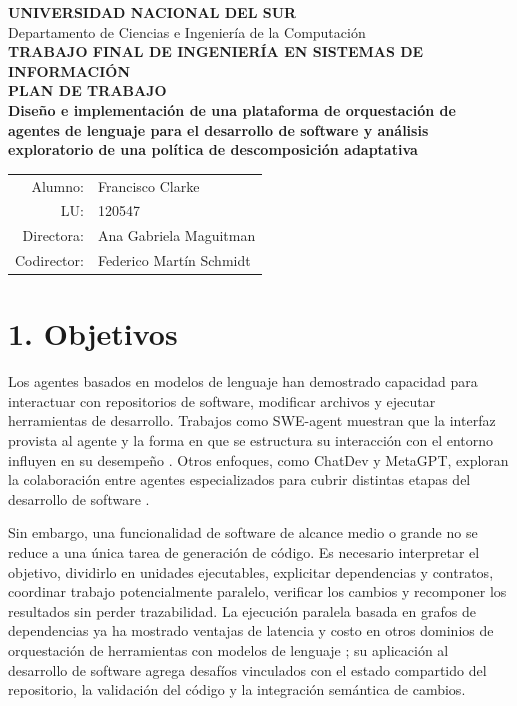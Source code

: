 \documentclass[11pt,a4paper]{article}
\newcommand{\autor}{Francisco Clarke}
\newcommand{\lu}{120547}
\newcommand{\director}{Ana Gabriela Maguitman}
\newcommand{\codirector}{Federico Mart\'in Schmidt}
\begin{document}
\begin{center}
  {\large\textbf{UNIVERSIDAD NACIONAL DEL SUR}}\\
  {\large Departamento de Ciencias e Ingenier\'ia de la Computaci\'on}\\[0.8em]
  {\large\textbf{TRABAJO FINAL DE INGENIER\'IA EN SISTEMAS DE INFORMACI\'ON}}\\
  {\Large\textbf{PLAN DE TRABAJO}}\\[1em]

  {\large\textbf{Dise\~no e implementaci\'on de una plataforma de
  orquestaci\'on de agentes de lenguaje para el desarrollo de software y
  an\'alisis exploratorio de una pol\'itica de descomposici\'on adaptativa}}\\[1em]

  \begin{tabular}{rl}
    Alumno: & \autor \\
    LU: & \lu \\
    Directora: & \director \\
    Codirector: & \codirector
  \end{tabular}
\end{center}

\section*{1. Objetivos}

Los agentes basados en modelos de lenguaje han demostrado capacidad para
interactuar con repositorios de software, modificar archivos y ejecutar
herramientas de desarrollo. Trabajos como SWE-agent muestran que la interfaz
provista al agente y la forma en que se estructura su interacci\'on con el
entorno influyen en su desempe\~no \cite{yang2024sweagent}. Otros enfoques, como
ChatDev y MetaGPT, exploran la colaboraci\'on entre agentes especializados para
cubrir distintas etapas del desarrollo de software
\cite{qian2024chatdev,hong2024metagpt}.

Sin embargo, una funcionalidad de software de alcance medio o grande no se
reduce a una \'unica tarea de generaci\'on de c\'odigo. Es necesario interpretar
el objetivo, dividirlo en unidades ejecutables, explicitar dependencias y
contratos, coordinar trabajo potencialmente paralelo, verificar los cambios y
recomponer los resultados sin perder trazabilidad. La ejecuci\'on paralela
basada en grafos de dependencias ya ha mostrado ventajas de latencia y costo en
otros dominios de orquestaci\'on de herramientas con modelos de lenguaje
\cite{kim2024llmcompiler}; su aplicaci\'on al desarrollo de software agrega
desaf\'ios vinculados con el estado compartido del repositorio, la validaci\'on
del c\'odigo y la integraci\'on sem\'antica de cambios.
\end{document}

